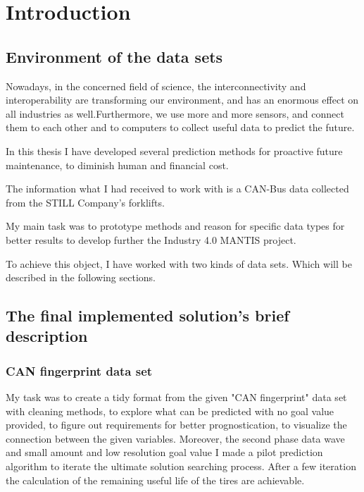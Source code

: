 \chapter*{Introduction}
\section{Environment of the data sets}
Nowadays, in the concerned field of science, the interconnectivity and interoperability are transforming our environment, and has an enormous effect on all industries as well.Furthermore, we use more and more sensors, and connect them to each other and to computers to collect useful data to predict the future.

In this thesis I have developed several prediction methods for proactive future maintenance, to diminish human and financial cost.

The information what I had received to work with is a CAN-Bus data collected from the STILL Company's forklifts.

My main task was to prototype methods and reason for specific data types for better results to develop further the Industry 4.0 MANTIS project.

To achieve this object, I have worked with two kinds of data sets. Which will be described in the following sections.
\section{The final implemented solution's brief description}
    \subsection{CAN fingerprint data set}
\noindent
My task was to create a tidy format from the given "CAN fingerprint" data set with cleaning methods, to explore what can be predicted with no goal value provided, to figure out requirements for better prognostication, to visualize the connection between the given variables. Moreover, the second phase data wave and small amount and low resolution goal value I made a pilot prediction algorithm to iterate the ultimate solution searching process. 
\noindent
After a few iteration the calculation of the remaining useful life of the tires are achievable. 
